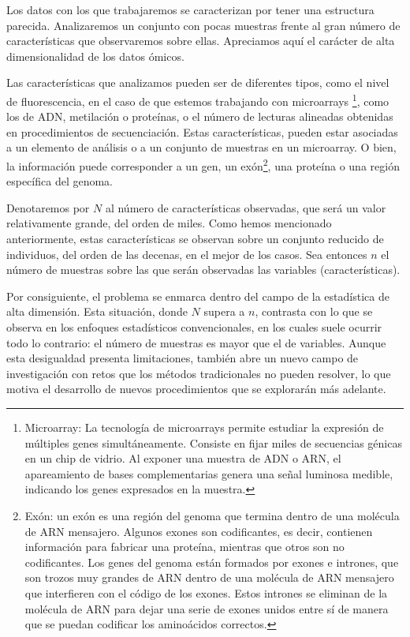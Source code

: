 Los datos con los que trabajaremos se caracterizan por tener una estructura parecida. Analizaremos un
conjunto con pocas muestras frente al gran número de características que observaremos sobre ellas. Apreciamos
aquí el carácter de alta dimensionalidad de los datos ómicos. \newline

Las características que analizamos pueden ser de diferentes tipos, como el nivel de fluorescencia, en el caso
de que estemos trabajando con microarrays \footnote[1]{Microarray: La tecnología de microarrays permite estudiar 
la expresión de múltiples genes simultáneamente. Consiste en fijar miles de secuencias génicas en un chip de vidrio. 
Al exponer una muestra de ADN o ARN, el apareamiento de bases complementarias genera una señal luminosa medible, 
indicando los genes expresados en la muestra\cite{microarray-definition}.}, como los de ADN, metilación o proteínas, o el número de lecturas 
alineadas obtenidas en procedimientos de secuenciación. Estas características, pueden estar asociadas a un
elemento de análisis o a un conjunto de muestras en un microarray. O bien, la información puede corresponder a
un gen, un exón\footnote[2]{Exón: un exón es una región del genoma que termina dentro de una molécula de ARN mensajero.
Algunos exones son codificantes, es decir, contienen información para fabricar una proteína, mientras que otros 
son no codificantes. Los genes del genoma están formados por exones e intrones, que son trozos muy grandes de ARN 
dentro de una molécula de ARN mensajero que interfieren con el código de los exones. 
Estos intrones se eliminan de la molécula de ARN para dejar una serie de exones unidos entre sí de manera que se 
puedan codificar los aminoácidos correctos.\cite{exon-definition}\cite{intron-definition}}, una proteína o una región específica del genoma. \newline

Denotaremos por $N$ al número de características observadas, que será un valor relativamente grande, del orden
de miles. Como hemos mencionado anteriormente, estas características se observan sobre un conjunto reducido de 
individuos, del orden de las decenas, en el mejor de los casos. Sea entonces $n$ el número de muestras sobre
las que serán observadas las variables (características). \newline

Por consiguiente, el problema se enmarca dentro del campo de la estadística de alta dimensión. Esta
situación, donde $N$ supera a $n$, contrasta con lo que se observa en los enfoques estadísticos convencionales,
en los cuales suele ocurrir todo lo contrario: el número de muestras es mayor que el de variables. Aunque esta
desigualdad presenta limitaciones, también abre un nuevo campo de investigación con retos que los métodos 
tradicionales no pueden resolver, lo que motiva el desarrollo de nuevos procedimientos que se explorarán más 
adelante. \newline

